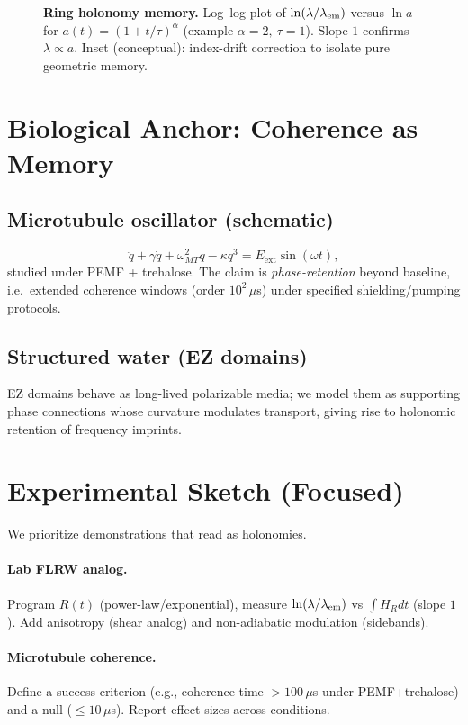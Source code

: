 \documentclass[11pt]{article}
\begin{document}
\begin{figure}[h]
  \centering
  \fbox{\rule{0pt}{1.6in}\rule{0.9\linewidth}{0pt}}
  \caption{\textbf{Ring holonomy memory.} Log--log plot of $\ln(\lambda/\lambda_{\rm em})$ versus $\ln a$ for $a(t)=(1+t/\tau)^\alpha$ (example $\alpha=2,\ \tau=1$).
  Slope $1$ confirms $\lambda\propto a$. Inset (conceptual): index-drift correction to isolate pure geometric memory.}
\end{figure}

\section{Biological Anchor: Coherence as Memory}
\subsection*{Microtubule oscillator (schematic)}
\[
\ddot{q} + \gamma \dot{q} + \omega_{MT}^2 q - \kappa q^3 = E_{\text{ext}}\sin(\omega t),
\]
studied under PEMF + trehalose. The claim is \emph{phase-retention} beyond baseline, i.e.\ extended coherence windows (order $10^2\,\mu$s) under specified shielding/pumping protocols.

\subsection*{Structured water (EZ domains)}
EZ domains behave as long-lived polarizable media; we model them as supporting phase connections whose curvature modulates transport, giving rise to holonomic retention of frequency imprints.

\section{Experimental Sketch (Focused)}
We prioritize demonstrations that read as holonomies.

\paragraph{Lab FLRW analog.} Program $R(t)$ (power-law/exponential), measure $\ln(\lambda/\lambda_{\rm em})$ vs $\int H_R dt$ (slope $1$). Add anisotropy (shear analog) and non-adiabatic modulation (sidebands).

\paragraph{Microtubule coherence.} Define a success criterion (e.g., coherence time $>100\,\mu$s under PEMF+trehalose) and a null ($\le 10\,\mu$s). Report effect sizes across conditions.
\end{document}
